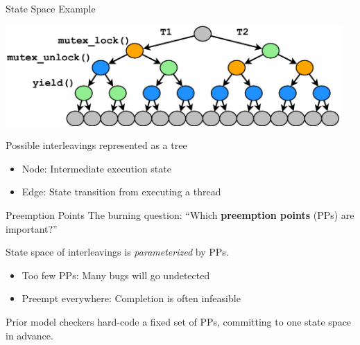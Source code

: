 \documentclass[xcolor=dvipsnames]{beamer}
\begin{document}
\begin{frame}{State Space Example}
	\begin{center}
		\includegraphics[width=0.96\textwidth]{tree-maximal-only.pdf}
	\end{center}
	\linegap

	Possible interleavings represented as a tree
	\begin{itemize}
		\item Node: Intermediate execution state 
		\item Edge: State transition from executing a thread
	\end{itemize}
\end{frame}

\begin{frame}{Preemption Points}
	The burning question: ``Which {\bf preemption points} (PPs) are important?''
	\linegap

	State space of interleavings is {\em parameterized} by PPs.
	\begin{itemize}
		\item Too few PPs: Many bugs will go undetected
		\item Preempt everywhere: Completion is often infeasible %
	\end{itemize}
	\linegap

	Prior model checkers hard-code a fixed set of PPs, committing to one state space in advance.
\end{frame}
\end{document}
